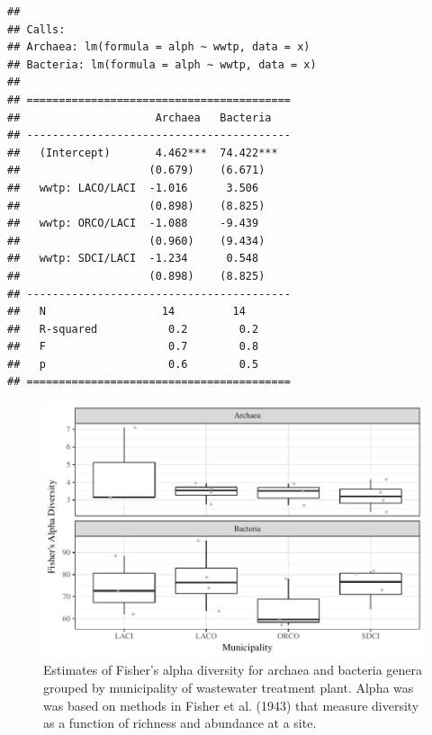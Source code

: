 \documentclass[letterpaper,12pt]{article}\usepackage[]{graphicx}\usepackage[]{color}
\makeatletter
\def\maxwidth{ %
  \ifdim\Gin@nat@width>\linewidth
    \linewidth
  \else
    \Gin@nat@width
  \fi
}
\newenvironment{kframe}{%
 \def\at@end@of@kframe{}%
 \ifinner\ifhmode%
  \def\at@end@of@kframe{\end{minipage}}%
  \begin{minipage}{\columnwidth}%
 \fi\fi%
 \def\FrameCommand##1{\hskip\@totalleftmargin \hskip-\fboxsep
 \colorbox{shadecolor}{##1}\hskip-\fboxsep
     \hskip-\linewidth \hskip-\@totalleftmargin \hskip\columnwidth}%
 \MakeFramed {\advance\hsize-\width
   \@totalleftmargin\z@ \linewidth\hsize
   \@setminipage}}%
 {\par\unskip\endMakeFramed%
 \at@end@of@kframe}
\newenvironment{knitrout}{}{} %
\makeatother
\begin{document}
\clearpage
\begin{knitrout}
\color{fgcolor}\begin{kframe}
\begin{verbatim}
## 
## Calls:
## Archaea: lm(formula = alph ~ wwtp, data = x)
## Bacteria: lm(formula = alph ~ wwtp, data = x)
## 
## =========================================
##                     Archaea   Bacteria   
## -----------------------------------------
##   (Intercept)       4.462***  74.422***  
##                    (0.679)    (6.671)    
##   wwtp: LACO/LACI  -1.016      3.506     
##                    (0.898)    (8.825)    
##   wwtp: ORCO/LACI  -1.088     -9.439     
##                    (0.960)    (9.434)    
##   wwtp: SDCI/LACI  -1.234      0.548     
##                    (0.898)    (8.825)    
## -----------------------------------------
##   N                  14         14       
##   R-squared           0.2        0.2     
##   F                   0.7        0.8     
##   p                   0.6        0.5     
## =========================================
\end{verbatim}
\end{kframe}\begin{figure}[!ht]

{\centering \includegraphics[width=\maxwidth]{figs/boxdivwwtp} 

}

\caption[Estimates of Fisher's alpha diversity for archaea and bacteria genera grouped by municipality of wastewater treatment plant]{Estimates of Fisher's alpha diversity for archaea and bacteria genera grouped by municipality of wastewater treatment plant. Alpha was was based on methods in Fisher et al. (1943) that measure diversity as a function of richness and abundance at a site.}\label{fig:boxdivwwtp}
\end{figure}


\end{knitrout}
\end{document}
